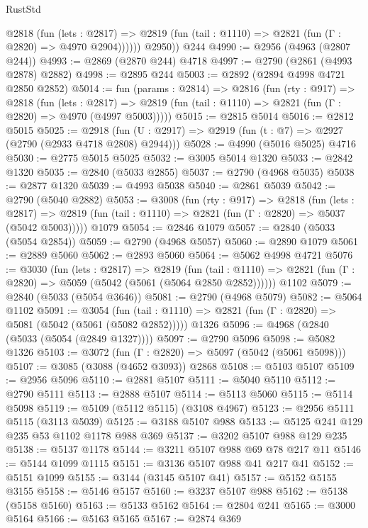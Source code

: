 \begin{lexlean}{RustStd}
\begin{coremodule}
            @2818
              (fun (lets : @2817) =>
              @2819 (fun (tail : @1110) => @2821 (fun (Γ : @2820) => @4970 @2904))))))
        @2950))
    @244
@4990 := @2956 (@4963 (@2807 @244))
@4993 := @2869 (@2870 @244) @4718
@4997 := @2790 (@2861 (@4993 @2878) @2882)
@4998 := @2895 @244
@5003 := @2892 (@2894 @4998 @4721 @2850 @2852)
@5014 := fun (params : @2814) =>
  @2816
    (fun (rty : @917) =>
    @2818
      (fun (lets : @2817) =>
      @2819 (fun (tail : @1110) => @2821 (fun (Γ : @2820) => @4970 (@4997 @5003)))))
@5015 := @2815 @5014
@5016 := @2812 @5015
@5025 := @2918 (fun (U : @2917) => @2919 (fun (t : @7) => @2927 (@2790 (@2933 @4718 @2808) @2944)))
@5028 := @4990 (@5016 @5025) @4716
@5030 := @2775 @5015 @5025
@5032 := @3005 @5014 @1320
@5033 := @2842 @1320
@5035 := @2840 (@5033 @2855)
@5037 := @2790 (@4968 @5035)
@5038 := @2877 @1320
@5039 := @4993 @5038
@5040 := @2861 @5039
@5042 := @2790 (@5040 @2882)
@5053 := @3008
    (fun (rty : @917) =>
    @2818
      (fun (lets : @2817) =>
      @2819 (fun (tail : @1110) => @2821 (fun (Γ : @2820) => @5037 (@5042 @5003)))))
    @1079
@5054 := @2846 @1079
@5057 := @2840 (@5033 (@5054 @2854))
@5059 := @2790 (@4968 @5057)
@5060 := @2890 @1079
@5061 := @2889 @5060
@5062 := @2893 @5060
@5064 := @5062 @4998 @4721
@5076 := @3030
    (fun (lets : @2817) =>
    @2819
      (fun (tail : @1110) => @2821 (fun (Γ : @2820) => @5059 (@5042 (@5061 (@5064 @2850 @2852))))))
    @1102
@5079 := @2840 (@5033 (@5054 @3646))
@5081 := @2790 (@4968 @5079)
@5082 := @5064 @1102
@5091 := @3054
    (fun (tail : @1110) => @2821 (fun (Γ : @2820) => @5081 (@5042 (@5061 (@5082 @2852)))))
    @1326
@5096 := @4968 (@2840 (@5033 (@5054 (@2849 @1327))))
@5097 := @2790 @5096
@5098 := @5082 @1326
@5103 := @3072 (fun (Γ : @2820) => @5097 (@5042 (@5061 @5098)))
@5107 := @3085 (@3088 (@4652 @3093)) @2868
@5108 := @5103 @5107
@5109 := @2956 @5096
@5110 := @2881 @5107
@5111 := @5040 @5110
@5112 := @2790 @5111
@5113 := @2888 @5107
@5114 := @5113 @5060
@5115 := @5114 @5098
@5119 := @5109 (@5112 @5115) (@3108 @4967)
@5123 := @2956 @5111 @5115 (@3113 @5039)
@5125 := @3188 @5107 @988
@5133 := @5125 @241 @129 @235 @53 @1102 @1178 @988 @369
@5137 := @3202 @5107 @988 @129 @235
@5138 := @5137 @1178
@5144 := @3211 @5107 @988 @69 @78 @217 @11
@5146 := @5144 @1099 @1115
@5151 := @3136 @5107 @988 @41 @217 @41
@5152 := @5151 @1099
@5155 := @3144 (@3145 @5107 @41)
@5157 := @5152 @5155 @3155
@5158 := @5146 @5157
@5160 := @3237 @5107 @988
@5162 := @5138 (@5158 @5160)
@5163 := @5133 @5162
@5164 := @2804 @241
@5165 := @3000 @5164
@5166 := @5163 @5165
@5167 := @2874 @369

\end{coremodule}
\end{lexlean}
